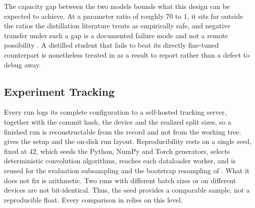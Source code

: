 The capacity gap between the two models bounds what this design can be expected to achieve. At a parameter ratio of roughly $70$ to $1$, it sits far outside the ratios the distillation literature treats as empirically safe, and negative transfer under such a gap is a documented failure mode and not a remote possibility \cite{mirzadehImprovedKnowledgeDistillation2020}. A distilled student that fails to beat its directly fine-tuned counterpart is nonetheless treated in  as a result to report rather than a defect to debug away.

\subsection{Experiment Tracking}\label{sec:experiment_tracking}

Every run logs its complete configuration to a self-hosted tracking server, together with the commit hash, the device and the realized split sizes, so a finished run is reconstructable from the record and not from the working tree.  gives the setup and the on-disk run layout. Reproducibility rests on a single seed, fixed at $42$, which seeds the Python, NumPy and Torch generators, selects deterministic convolution algorithms, reaches each dataloader worker, and is reused for the evaluation subsampling and the bootstrap resampling of . What it does not fix is arithmetic. Two runs with different batch sizes or on different devices are not bit-identical. Thus, the seed provides a comparable sample, not a reproducible float. Every comparison in  relies on this level.
